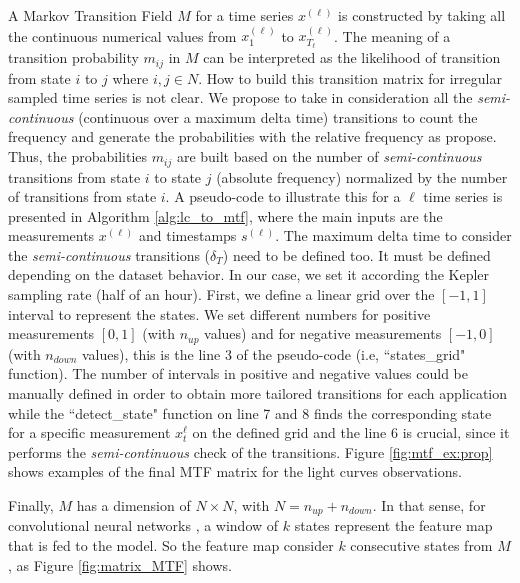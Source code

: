 A Markov Transition Field $M$ \citep{wang2015imaging} for a time series $x^{(\ell)}$ is constructed by taking all the continuous numerical values from $x_1^{(\ell)}$ to $x_{T_{\ell}}^{(\ell)}$. The meaning of a transition probability $m_{ij}$ in $M$ can be interpreted as the likelihood of transition from state $i$ to $j$ where $i,j \in N$. 
How to build this transition matrix for irregular sampled time series is not clear. We propose to take in consideration all the \textit{semi-continuous} (continuous over a maximum delta time) transitions to count the frequency and generate the probabilities with the relative frequency as \citep{wang2015imaging} propose. 
Thus, the probabilities $m_{ij}$ are built based on the number of \textit{semi-continuous} transitions from state $i$ to state $j$ (absolute frequency) normalized by the number of transitions from state $i$.
A pseudo-code to illustrate this for a $\ell$ time series is presented in Algorithm \ref{alg:lc_to_mtf}, where the main inputs are the measurements $x^{(\ell)}$ and timestamps $s^{(\ell)}$.
The maximum delta time to consider the \textit{semi-continuous} transitions ($\delta_T$) need to be defined too. It must be defined depending on the dataset behavior. In our case, we set it according the Kepler sampling rate (half of an hour).
First, we define a linear grid over the $[-1,1]$ interval to represent the states. We set different numbers for positive measurements $[0,1]$ (with $n_{up}$ values) and for negative measurements $[-1,0]$ (with $n_{down}$ values), this is the line 3 of the pseudo-code (i.e, ``states\_grid" function).
The number of intervals in positive and negative values could be manually defined in order to obtain more tailored transitions for each application while the ``detect\_state" function on line 7 and 8 finds the corresponding state for a specific measurement $x_t^{\ell}$ on the defined grid and
the line 6 is crucial, since it performs the \textit{semi-continuous} check of the transitions. 
Figure \ref{fig:mtf_ex:prop} shows examples of the final MTF matrix for the light curves observations.

Finally, $M$ has a dimension of $N \times N$, with $N=n_{up}+n_{down}$. In that sense, for convolutional neural networks \citep{krizhevsky2012imagenet}, a window of $k$ states represent the feature map that is fed to the model. So the feature map consider $k$ consecutive states from $M$, as Figure \ref{fig:matrix_MTF} shows.



